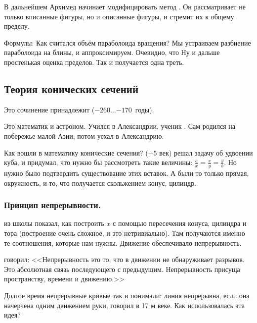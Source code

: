 \documentclass[a4paper,oneside,fleqn,10pt]{article}
\newcommand{\pe}[2]{${#1}\ldots{#2}$}
\begin{document}
В дальнейшем Архимед начинает модифицировать метод .
Он рассматривает не только вписанные фигуры, но и описанные фигуры,
и стремит их к общему пределу.

Формулы:
Как считался объём параболоида вращения?
Мы устраиваем разбиение параболоида на блины, и аппроксимируем.
Очевидно, что
Ну и дальше простенькая оценка пределов. Так и получается одна треть.


\subsection{Теория конических сечений}

\label{sec:conicae}

Это сочинение принадлежит  (\pe{-260}{-170}~годы).

Это математик и астроном. Учился в Александрии, ученик . Сам родился на побережье
малой Азии, потом уехал в Александрию.

Как вошли в математику конические сечения?  ($-5$ век) решал задачу об
удвоении куба, и придумал, что нужно бы рассмотреть такие величины:
$\frac ax = \frac xy = \frac yb$. Но нужно было подтвердить существование этих вставок.
А были то только прямая, окружность, и то, что получается скольжением конус, цилиндр.

\subsubsection{Принцип непрерывности.}

 из школы  показал, как построить $x$ с помощью пересечения
конуса, цилиндра и тора (построение очень сложное, и это нетривиально).
Там получаются именно те соотношения, которые нам нужны.
Движение обеспечивало непрерывность.

 говорил: <<Непрерывность это то, что в движении не обнаруживает разрывов.
Это абсолютная связь последующего с предыдущим. Непрерывность присуща
пространству, времени и движению.>>

Долгое время непрерывные кривые так и понимали: линия непрерывна, если она начерчена
одним движением руки, говорил  в 17 м веке.
Как использовалась эта идея?
\end{document}
